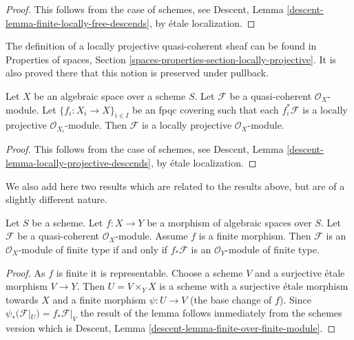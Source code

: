\begin{proof}
This follows from the case of schemes, see
Descent, Lemma \ref{descent-lemma-finite-locally-free-descends},
by \'etale localization.
\end{proof}

\noindent
The definition of a locally projective quasi-coherent sheaf can be found in
Properties of spaces,
Section \ref{spaces-properties-section-locally-projective}.
It is also proved there that this notion is preserved under pullback.

\begin{lemma}
\label{lemma-locally-projective-descends}
Let $X$ be an algebraic space over a scheme $S$.
Let $\mathcal{F}$ be a quasi-coherent $\mathcal{O}_X$-module.
Let $\{f_i : X_i \to X\}_{i \in I}$ be an fpqc covering such that
each $f_i^*\mathcal{F}$ is a locally projective $\mathcal{O}_{X_i}$-module.
Then $\mathcal{F}$ is a locally projective $\mathcal{O}_X$-module.
\end{lemma}

\begin{proof}
This follows from the case of schemes, see
Descent, Lemma \ref{descent-lemma-locally-projective-descends},
by \'etale localization.
\end{proof}

\noindent
We also add here two results which are related to the results above, but
are of a slightly different nature.

\begin{lemma}
\label{lemma-finite-over-finite-module}
Let $S$ be a scheme.
Let $f : X \to Y$ be a morphism of algebraic spaces over $S$.
Let $\mathcal{F}$ be a quasi-coherent $\mathcal{O}_X$-module.
Assume $f$ is a finite morphism.
Then $\mathcal{F}$ is an $\mathcal{O}_X$-module of finite type
if and only if $f_*\mathcal{F}$ is an $\mathcal{O}_Y$-module of finite
type.
\end{lemma}

\begin{proof}
As $f$ is finite it is representable. Choose a scheme $V$ and a surjective
\'etale morphism $V \to Y$. Then $U = V \times_Y X$ is a scheme with
a surjective \'etale morphism towards $X$ and a finite morphism
$\psi : U \to V$ (the base change of $f$). Since
$\psi_*(\mathcal{F}|_U) = f_*\mathcal{F}|_V$
the result of the lemma follows immediately from the schemes version which
is
Descent, Lemma \ref{descent-lemma-finite-over-finite-module}.
\end{proof}

